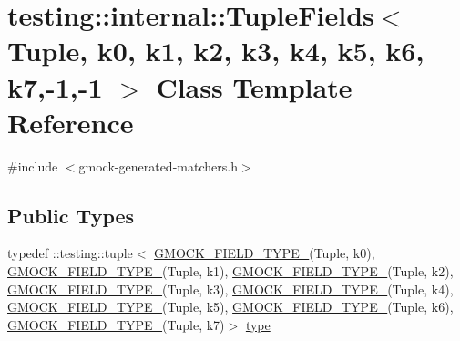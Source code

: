 \hypertarget{classtesting_1_1internal_1_1_tuple_fields_3_01_tuple_00_01k0_00_01k1_00_01k2_00_01k3_00_01k4_00_0063f8a87602abfee3b4568185bc2c75}{}\section{testing\+:\+:internal\+:\+:Tuple\+Fields$<$ Tuple, k0, k1, k2, k3, k4, k5, k6, k7,-\/1,-\/1 $>$ Class Template Reference}
\label{classtesting_1_1internal_1_1_tuple_fields_3_01_tuple_00_01k0_00_01k1_00_01k2_00_01k3_00_01k4_00_0063f8a87602abfee3b4568185bc2c75}


{\ttfamily \#include $<$gmock-\/generated-\/matchers.\+h$>$}

\subsection*{Public Types}
\begin{DoxyCompactItemize}
\item 
typedef \+::testing\+::tuple$<$ \hyperlink{gmock-generated-matchers_8h_acf3e27de83a73f0d873da1cd471e505b}{G\+M\+O\+C\+K\+\_\+\+F\+I\+E\+L\+D\+\_\+\+T\+Y\+P\+E\+\_\+}(Tuple, k0), \hyperlink{gmock-generated-matchers_8h_acf3e27de83a73f0d873da1cd471e505b}{G\+M\+O\+C\+K\+\_\+\+F\+I\+E\+L\+D\+\_\+\+T\+Y\+P\+E\+\_\+}(Tuple, k1), \hyperlink{gmock-generated-matchers_8h_acf3e27de83a73f0d873da1cd471e505b}{G\+M\+O\+C\+K\+\_\+\+F\+I\+E\+L\+D\+\_\+\+T\+Y\+P\+E\+\_\+}(Tuple, k2), \hyperlink{gmock-generated-matchers_8h_acf3e27de83a73f0d873da1cd471e505b}{G\+M\+O\+C\+K\+\_\+\+F\+I\+E\+L\+D\+\_\+\+T\+Y\+P\+E\+\_\+}(Tuple, k3), \hyperlink{gmock-generated-matchers_8h_acf3e27de83a73f0d873da1cd471e505b}{G\+M\+O\+C\+K\+\_\+\+F\+I\+E\+L\+D\+\_\+\+T\+Y\+P\+E\+\_\+}(Tuple, k4), \hyperlink{gmock-generated-matchers_8h_acf3e27de83a73f0d873da1cd471e505b}{G\+M\+O\+C\+K\+\_\+\+F\+I\+E\+L\+D\+\_\+\+T\+Y\+P\+E\+\_\+}(Tuple, k5), \hyperlink{gmock-generated-matchers_8h_acf3e27de83a73f0d873da1cd471e505b}{G\+M\+O\+C\+K\+\_\+\+F\+I\+E\+L\+D\+\_\+\+T\+Y\+P\+E\+\_\+}(Tuple, k6), \hyperlink{gmock-generated-matchers_8h_acf3e27de83a73f0d873da1cd471e505b}{G\+M\+O\+C\+K\+\_\+\+F\+I\+E\+L\+D\+\_\+\+T\+Y\+P\+E\+\_\+}(Tuple, k7)$>$ \hyperlink{classtesting_1_1internal_1_1_tuple_fields_3_01_tuple_00_01k0_00_01k1_00_01k2_00_01k3_00_01k4_00_0063f8a87602abfee3b4568185bc2c75_a391bb0758025c4f9238011be4bf6c1d1}{type}
\end{DoxyCompactItemize}
